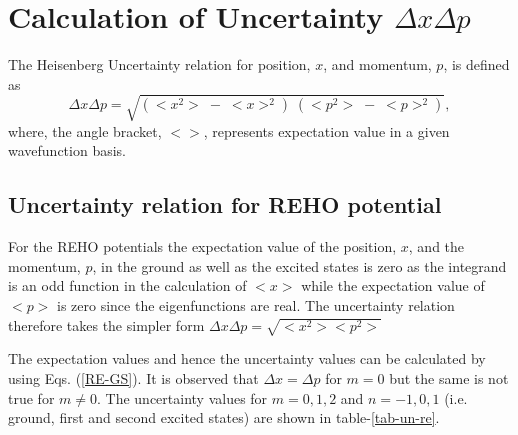 \documentclass[11pt]{article}
\begin{document}

\section{Calculation of Uncertainty $\Delta x \Delta p$}
The Heisenberg Uncertainty relation for position, \( x \), and momentum, \( p \), is defined as 
\begin{equation}
\Delta x\Delta p=\sqrt{\left(<x^2>\;-\;<x>^2\right)\;\left(<p^2>\;-\;<p>^2\right)},
\end{equation}
where, the angle bracket, \( <> \), represents expectation value in a given wavefunction basis.

\subsection{Uncertainty relation for REHO potential}
For the REHO potentials the expectation value of the position, \( x \), and 
the momentum, \( p \), in the ground as well as the excited states is zero as 
the integrand is an odd function in the calculation of \( <x> \) while the 
expectation value of \( <p> \) is zero since the eigenfunctions are real. The 
uncertainty relation therefore takes the simpler form
\( \Delta x\Delta p =\sqrt{<x^2><p^2>}\)

The expectation values and hence the uncertainty values can be calculated by
using Eqs. (\ref{RE-GS}). It is observed that \( \Delta x =\Delta p\) for \( m=0 \) but the same is not true for \( m\neq 0 \).  The uncertainty values for $m = 0, 1,2$ and $n = -1, 0, 1$ (i.e. ground, first and second excited states) are shown in table-\ref{tab-un-re}.
\end{document}
